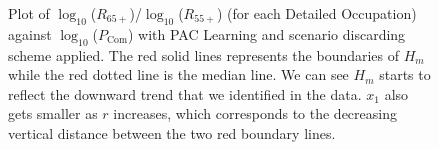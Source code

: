 \documentclass[11pt]{article}
\begin{document}
\begin{figure}[!htb]
    \ContinuedFloat
    \centering
	\hfill	
	\hfill
	\caption{Plot of $\log_{10}$($R_{65+}$)/$\log_{10}$($R_{55+}$) (for each Detailed Occupation) against $\log_{10}$($P_{\text{Com}}$) with PAC Learning and scenario discarding scheme applied. The red solid lines represents the boundaries of $H_{m}$ while the red dotted line is the median line. We can see $H_{m}$ starts to reflect the downward trend that we identified in the data. $x_{1}$ also gets smaller as $r$ increases, which corresponds to the decreasing vertical distance between the two red boundary lines.}
  	\label{fig:pac2}

\end{figure}
\end{document}
